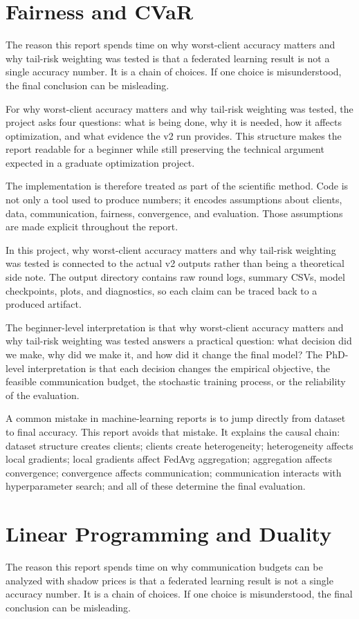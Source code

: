 \documentclass[11pt]{report}
\begin{document}
\chapter{Fairness and CVaR}
The reason this report spends time on why worst-client accuracy matters and why tail-risk weighting
was tested is that a federated learning result is not a single accuracy number. It is a chain of
choices. If one choice is misunderstood, the final conclusion can be misleading.

For why worst-client accuracy matters and why tail-risk weighting was tested, the project asks four
questions: what is being done, why it is needed, how it affects optimization, and what evidence the
v2 run provides. This structure makes the report readable for a beginner while still preserving the
technical argument expected in a graduate optimization project.

The implementation is therefore treated as part of the scientific method. Code is not only a tool
used to produce numbers; it encodes assumptions about clients, data, communication, fairness,
convergence, and evaluation. Those assumptions are made explicit throughout the report.

In this project, why worst-client accuracy matters and why tail-risk weighting was tested is
connected to the actual v2 outputs rather than being a theoretical side note. The output directory
contains raw round logs, summary CSVs, model checkpoints, plots, and diagnostics, so each claim can
be traced back to a produced artifact.

The beginner-level interpretation is that why worst-client accuracy matters and why tail-risk
weighting was tested answers a practical question: what decision did we make, why did we make it,
and how did it change the final model? The PhD-level interpretation is that each decision changes
the empirical objective, the feasible communication budget, the stochastic training process, or the
reliability of the evaluation.

A common mistake in machine-learning reports is to jump directly from dataset to final accuracy.
This report avoids that mistake. It explains the causal chain: dataset structure creates clients;
clients create heterogeneity; heterogeneity affects local gradients; local gradients affect FedAvg
aggregation; aggregation affects convergence; convergence affects communication; communication
interacts with hyperparameter search; and all of these determine the final evaluation.

\chapter{Linear Programming and Duality}
The reason this report spends time on why communication budgets can be analyzed with shadow prices
is that a federated learning result is not a single accuracy number. It is a chain of choices. If
one choice is misunderstood, the final conclusion can be misleading.
\end{document}
